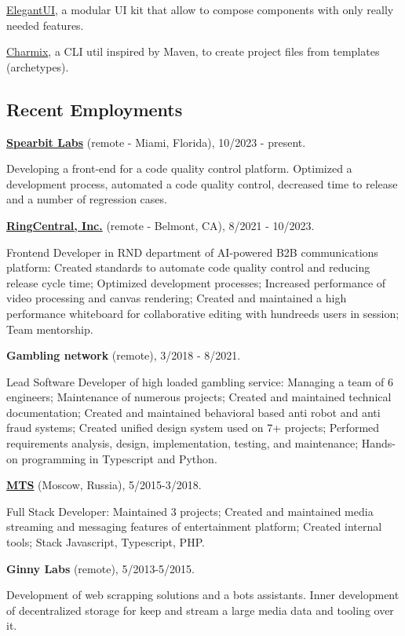 \documentclass{vitonsky}
\begin{document}
\href{https://github.com/vitonsky/react-elegant-ui}{ElegantUI}, a
modular UI kit that allow to compose components with only really needed features.

\href{https://github.com/vitonsky/charmix}{Charmix}, a CLI util inspired
by Maven, to create project files from templates (archetypes).

\subsection*{Recent Employments}

\textbf{\href{https://spearbit.com/}{Spearbit Labs}} (remote -  Miami, Florida), 10/2023 - present.

Developing a front-end for a code quality control platform. Optimized a development process, automated a code quality control, decreased time to release and a number of regression cases.

\textbf{\href{https://www.ringcentral.com/}{RingCentral, Inc.}} (remote - Belmont, CA), 8/2021 - 10/2023.

Frontend Developer in RND department of AI-powered B2B communications platform: Created standards to automate code quality control and reducing release cycle time; Optimized development processes; Increased performance of video processing and canvas rendering; Created and maintained a high performance whiteboard for collaborative editing with hundreeds users in session; Team mentorship.

\textbf{Gambling network} (remote), 3/2018 - 8/2021.

Lead Software Developer of high loaded gambling service: Managing a team of 6 engineers; Maintenance of numerous projects; Created and maintained technical documentation; Created and maintained behavioral based anti robot and anti fraud systems; Created unified design system used on 7+ projects; Performed requirements analysis, design, implementation, testing, and maintenance; Hands-on programming in Typescript and Python.

\textbf{\href{https://mts.ru}{MTS}} (Moscow, Russia), 5/2015-3/2018.

Full Stack Developer: Maintained 3 projects; Created and maintained media streaming and messaging features of entertainment platform; Created internal tools; Stack Javascript, Typescript, PHP.

\textbf{Ginny Labs} (remote), 5/2013-5/2015.

Development of web scrapping solutions and a bots assistants. Inner development of decentralized storage for keep and stream a large media data and tooling over it.
\end{document}

